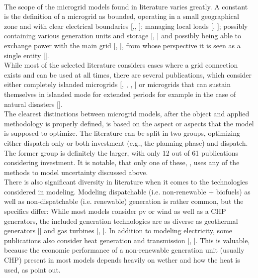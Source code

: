 \documentclass[
	11pt,								%
	DIV10,								%
	a4paper,         					%
	oneside,							%
	headheight=20pt,					%
	footheight=20pt,					%
    parskip=full,						%
    listof=totoc,						%
	bibliography=totoc,					%
	index=totoc,						%
]{scrartcl}
\begin{document}
\\
The scope of the microgrid models found in literature varies greatly. A constant is the definition of a microgrid as bounded, operating in a small geographical zone and with clear electrical boundaries [\cite{TAVAKOLI20181},\cite{mashayekhMixedIntegerLinear2017}, \cite{7853085}]; managing local loads [\cite{zhang2013efficient}, \cite{ZHENG2018836}]; possibly containing various generation units and storage [\cite{silvente2015rolling}, \cite{7741704}] and possibly being able to exchange power with the main grid [\cite{NEMATI2018944}, \cite{SOLTANINEJADFARSANGI2018257}], from whose perspective it is seen as a single entity [\cite{KOLTSAKLIS2018318}].
\\
While most of the selected literature considers cases where a grid connection exists and can be used at all times, there are several publications, which consider either completely islanded microgrids [\cite{ZHANG20181229}, \cite{palma2013microgrid}, \cite{6872087}, \cite{7281564}] or microgrids that can sustain themselves in islanded mode for extended periods for example in the case of natural disasters [\cite{TAVAKOLI20181}].
\\
The clearest distinctions between microgrid models, after the object and applied methodology is properly defined, is based on the aspect or aspects that the model is supposed to optimize. The literature can be split in two groups, optimizing either  dispatch only or both investment (e.g., the planning phase) and dispatch. The former group is definitely the larger, with only 12 out of 61 publications considering investment. It is notable, that only one of these, \cite{7540870}, uses any of the methods to model uncertainty discussed above.
\\
There is also significant diversity in literature when it comes to the technologies considered in modeling.
Modeling dispatchable (i.e. non-renewable + biofuels) as well as non-dispatchable (i.e. renewable) generation is rather common, but the specifics differ:
While most models consider pv or wind as well as a CHP generators, the included generation technologies are as diverse as geothermal generators [\cite{7975049}] and gas turbines [\cite{UMEOZOR2016272}, \cite{NEMATI2018944}]. In addition to modeling electricity, some publications also consider heat generation and transmission [\cite{LAUINGER201624}, \cite{wouters2015energy}]. This is valuable, because the economic performance of a non-renewable generation unit (usually CHP) present in most models depends heavily on wether and how the heat is used, as \cite{costa2014mixed} point out.
\end{document}
